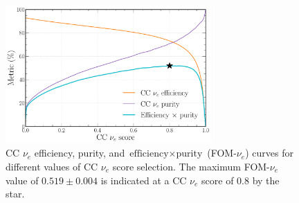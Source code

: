 \begin{figure} %
    \includegraphics[width=0.7\textwidth]{diagrams/7-results/final_nuel_eff_curves.pdf}
    \caption[CC $\nu_{e}$ efficiency, purity, and $\text{efficiency}\times\text{purity}$ curves]
    {CC $\nu_{e}$ efficiency, purity, and $\text{efficiency}\times\text{purity}$ (FOM-$\nu_e$)
        curves for different values of CC $\nu_{e}$ score selection. The maximum FOM-$\nu_e$ value
        of $0.519\pm0.004$ is indicated at a CC $\nu_{e}$ score of $0.8$ by the star.}
    \label{fig:final_nuel_eff_curves}
\end{figure}

